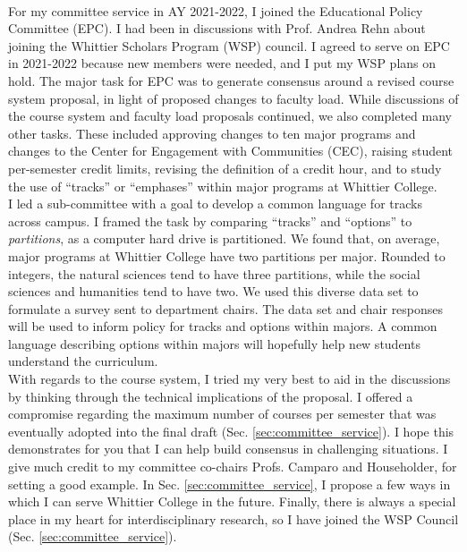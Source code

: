 \documentclass[../../main.tex]{subfiles}
\begin{document}
\\
\vspace{0.25cm}
For my committee service in AY 2021-2022, I joined the Educational Policy Committee (EPC).  I had been in discussions with Prof. Andrea Rehn about joining the Whittier Scholars Program (WSP) council.  I agreed to serve on EPC in 2021-2022 because new members were needed, and I put my WSP plans on hold.  The major task for EPC was to generate consensus around a revised course system proposal, in light of proposed changes to faculty load.  While discussions of the course system and faculty load proposals continued, we also completed many other tasks.  These included approving changes to ten major programs and changes to the Center for Engagement with Communities (CEC), raising student per-semester credit limits, revising the definition of a credit hour, and to study the use of ``tracks'' or ``emphases'' within major programs at Whittier College.
\\
\vspace{0.25cm}
I led a sub-committee with a goal to develop a common language for tracks across campus.  I framed the task by comparing ``tracks'' and ``options'' to \textit{partitions}, as a computer hard drive is partitioned.  We found that, on average, major programs at Whittier College have two partitions per major. Rounded to integers, the natural sciences tend to have three partitions, while the social sciences and humanities tend to have two.  We used this diverse data set to formulate a survey sent to department chairs.  The data set and chair responses will be used to inform policy for tracks and options within majors.  A common language describing options within majors will hopefully help new students understand the curriculum.
\\
\vspace{0.25cm}
With regards to the course system, I tried my very best to aid in the discussions by thinking through the technical implications of the proposal.  I offered a compromise regarding the maximum number of courses per semester that was eventually adopted into the final draft (Sec. \ref{sec:committee_service}).  I hope this demonstrates for you that I can help build consensus in challenging situations.  I give much credit to my committee co-chairs Profs. Camparo and Householder, for setting a good example.  In Sec. \ref{sec:committee_service}, I propose a few ways in which I can serve Whittier College in the future.  Finally, there is always a special place in my heart for interdisciplinary research, so I have joined the WSP Council (Sec. \ref{sec:committee_service}).
\end{document}
